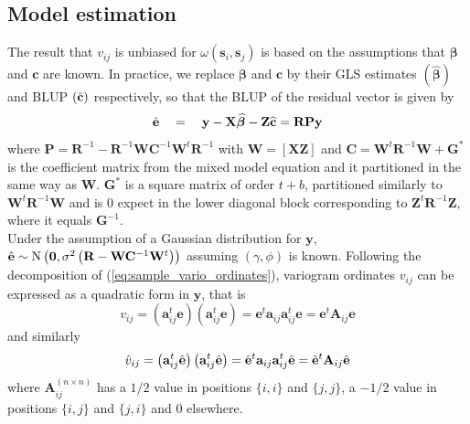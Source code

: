 \subsection{Model estimation}
The result that $v_{i j}$ is unbiased for $\omega\left(\mathbf{s}_{i}, \mathbf{s}_{j}\right)$ is based on the assumptions that $\boldsymbol{\beta}$ and $\mathbf{c}$ are known. In practice, we replace $\boldsymbol{\beta}$ and $\mathbf{c}$ by their GLS estimates $( \widehat{\boldsymbol{\beta}})$ and BLUP $\left( \Hat{\mathbf{c}}\right)$ respectively, so that the BLUP of the residual vector is given by
\begin{equation}
    \Hat{\mathbf{e}} \quad=\quad \mathbf{y}-\mathbf{X} \widehat{\boldsymbol{\beta}}-\mathbf{Z} \widehat{\mathbf{c}}=\mathbf{RP} \mathbf{y}
\end{equation} 
where $\mathbf{P}=\mathbf{R}^{-1}-\mathbf{R}^{-1} \mathbf{W} \mathbf{C}^{-1} \mathbf{W}^{t} \mathbf{R}^{-1}$ with $\boldsymbol{W}=[\boldsymbol{X} \mathbf{Z}]$ and $\mathbf{C}=\mathbf{W}^{t} \mathbf{R}^{-1} \mathbf{W}+\mathbf{G}^{*}$ is the coefficient matrix from the mixed model equation and it partitioned in the same way as $\mathbf{W}$. $\mathbf{G}^*$ is a square matrix of order $t+b$, partitioned similarly to  $\mathbf{W}^{t} \mathbf{R}^{-1} \mathbf{W}$ and is 0 expect in the lower diagonal block corresponding to $\mathbf{Z}^{t} \mathbf{R}^{-1} \mathbf{Z}$, where it equals $\mathbf{G}^{-1}$.\\
Under the assumption of a Gaussian distribution for $\mathbf{y}$, $\Hat{\mathbf{e}} \sim \mathrm{N}\left(\mathbf{0}, \sigma^{2}\left(\mathbf{R}-\mathbf{W} \mathbf{C}^{-1} \mathbf{W}^{t}\right)\right)$ assuming $(\gamma, \phi)$ is known. Following the decomposition of (\ref{eq:sample_vario_ordinates}), variogram ordinates $v_{ij}$ can be expressed as a quadratic form in $\mathbf{y}$, that is
\begin{equation}
    v_{i j}=\left(\mathbf{a}_{i j}^{t} \mathbf{e}\right)\left(\mathbf{a}_{i j}^{t} \mathbf{e}\right)=\mathbf{e}^{t} \mathbf{a}_{i j} \mathbf{a}_{i j}^{t} \mathbf{e}=\mathbf{e}^{t} \mathbf{A}_{i j} \mathbf{e}
\end{equation}
and similarly
\begin{equation}
    \Hat{v}_{i j}=\left(\mathbf{a}_{i j}^{t} \Hat{\mathbf{e}}\right)\left(\mathbf{a}_{i j}^{t} \Hat{\mathbf{e}}\right)=\Hat{\mathbf{e}}^{t} \mathbf{a}_{i j} \mathbf{a}_{i j}^{t} \Hat{\mathbf{e}}=\Hat{\mathbf{e}}^{t} \mathbf{A}_{i j} \Hat{\mathbf{e}}
\end{equation}
where $\mathbf{A}_{i j}^{(n \times n)}$ has a $1/2$ value in positions $\{i,i\}$ and $\{j,j\}$, a $-1/2$ value in positions $\{i,j\}$ and $\{j,i\}$ and $0$ elsewhere.\\
